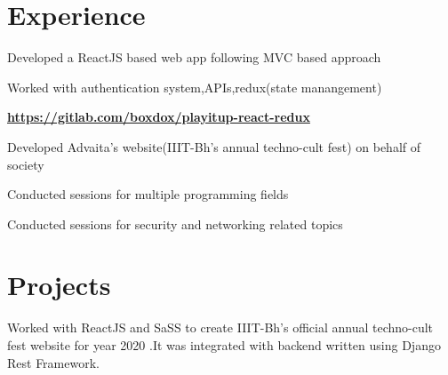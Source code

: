 \documentclass[]{deedy-resume-openfont}
\begin{document}
\begin{minipage}[t]{0.66\textwidth} 


\section{Experience}
\vspace{\topsep} %
\begin{tightemize}
\item Developed a ReactJS based web app following MVC based approach
\item Worked with authentication system,APIs,redux(state manangement)
\item \textbf{\href{https://gitlab.com/boxdox/playitup-react-redux}{https://gitlab.com/boxdox/playitup-react-redux}}
\end{tightemize}
\sectionsep

\begin{tightemize}
\item Developed Advaita's website(IIIT-Bh's annual techno-cult fest) on behalf of society
\item Conducted sessions for multiple programming fields
\end{tightemize}
\sectionsep

\begin{tightemize}
\item Conducted sessions for security and networking related topics
\end{tightemize}
\sectionsep


\section{Projects}
 Worked with ReactJS and SaSS to create IIIT-Bh's official annual techno-cult fest website for year 2020 .It was integrated with backend written using Django Rest Framework. 


\end{minipage}
\end{document}
